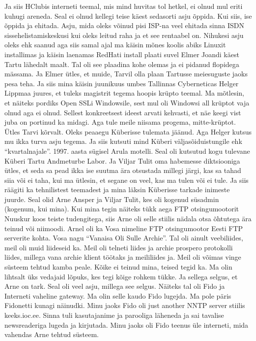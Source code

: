 Ja siis HClubis interneti teemal, mis mind huvitas tol hetkel, ei olnud mul eriti kuhugi areneda. Seal ei olnud kellegi teise käest sedasorti asju õppida. Kui siis, ise õppida ja ehitada.  Asju, mida oleks võinud pisi ISP-na veel ehitada sinna ISDN sissehelistamiskeskusi kui oleks leitud raha ja et see rentaabel on. Nihukesi asju oleks ehk saanud aga siis samal ajal ma käisin mõnes koolis abiks Linuxit installimas ja käisin laenamas RedHati install plaati suvel Elmer Joandi käest Tartu lähedalt maalt. Tal oli see plaadina kohe olemas ja ei pidanud flopidega mässama. Ja Elmer ütles, et muide, Tarvil olla plaan Tartusse meiesuguste jaoks pesa teha. Ja siis mina käisin juunikuus umbes Tallinnas Cyberneticas Helger Lippmaa  juures, et tuleks magistrit tegema hoopis krüpto teemal. Ma mõtlesin, et näiteks pordiks Open SSLi Windowsile, sest mul oli Windowsi all krüptot vaja olnud aga ei olnud. Sellest konkreetsest ideest arvati kehvasti, et näe keegi vist juba on portinud ka midagi. Aga tule meile niisama progema, mitte-krüptot. Ütles Tarvi kõrvalt. Oleks peaaegu Küberisse tulemata jäänud. Aga Helger kutsus mu ikka turva asju tegema. Ja siis kutsuti mind Küberi väljasõiduistungile ehk \enquote{kvartalnajale}. 1997. aasta sügisel Arula motelli. Seal oli kutsutud kogu tulevane Küberi Tartu Andmeturbe Labor. Ja Viljar Tulit oma habemesse diktsiooniga ütles, et seda sa pead ikka ise suutma ära otsustada millegi järgi, kas sa tahad siia või ei taha, kui ma ütlesin, et segane on veel, kas ma tulen või ei tule. Ja siis räägiti ka tehnilistest teemadest ja mina läksin Küberisse tarkade inimeste juurde. Seal olid Arne Ansper ja Viljar Tulit, kes oli kogenud süsadmin (kogenum, kui mina). Kui mina tegin näiteks tükk aega FTP otsingumootorit Nuuskur koos teiste tudengitega, siis Arne oli selle stiilis nädala otsa õhtutega ära teinud või niimoodi. Arnel oli ka Vosa nimeline FTP otsingumootor Eesti FTP serverite kohta. Vosa nagu \enquote{Vanaisa Oli Sulle Archie}. Tal oli ainult veebiliides, meil oli muid liideseid ka. Meil oli telneti liides ja archie prospero protokolli liides, millega vana archie klient töötaks ja meililiides ja. Meil oli võimas vinge süsteem tehtud kamba peale. Kõike ei teinud mina, teised tegid ka. Ma olin lihtsalt üks vedajaid lõpuks, kes tegi kõige rohkem tükke. Ja sellega selgus, et Arne on tark. Seal oli veel asju, millega see selgus. Näiteks tal oli Fido ja Interneti vaheline gateway. Ma olin selle kaudo Fido lugejda. Ma pole päris Fidonetti kunagi näinudki. Minu jaoks Fido oli just another NNTP server stiilis keeks.ioc.ee. Sinna tuli kasutajanime ja parooliga läheneda ja sai tavalise newsreaderiga lugeda ja kirjutada. Minu jaoks oli Fido teenus üle interneti, mida vahendas Arne tehtud süsteem. 

